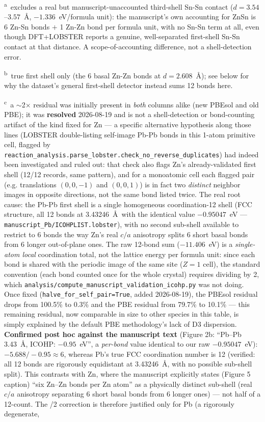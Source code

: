 \vspace{0.3em}
\noindent\textsuperscript{a}~excludes a real but manuscript-unaccounted third-shell Sn-Sn contact ($d=3.54$--$3.57$~\AA, $-1.336$~eV/formula unit): the manuscript's own accounting for ZnSn is 6 Zn-Sn bonds $+$ 1 Zn-Zn bond per formula unit, with no Sn-Sn term at all, even though DFT+LOBSTER reports a genuine, well-separated first-shell Sn-Sn contact at that distance. A scope-of-accounting difference, not a shell-detection error.

\noindent\textsuperscript{b}~true first shell only (the 6 basal Zn-Zn bonds at $d=2.608$~\AA); see below for why the dataset's general first-shell detector instead sums 12 bonds here.

\noindent\textsuperscript{c}~a $\sim$2$\times$ residual was initially present in \emph{both} columns alike (new PBEsol and old PBE); it was \textbf{resolved} 2026-08-19 and is not a shell-detection or bond-counting artifact of the kind fixed for Zn --- a specific alternative hypothesis along those lines (LOBSTER double-listing self-image Pb-Pb bonds in this 1-atom primitive cell, flagged by \texttt{reaction\_analysis.parse\_lobster.check\_no\_reverse\_duplicates}) had indeed been investigated and ruled out: that check also flags Zn's already-validated first shell (12/12 records, same pattern), and for a monoatomic cell each flagged pair (e.g. translations $(0,0,-1)$ and $(0,0,1)$) is in fact two \emph{distinct} neighbor images in opposite directions, not the same bond listed twice. The real root cause: the Pb-Pb first shell is a single homogeneous coordination-12 shell (FCC structure, all 12 bonds at 3.43246~\AA\ with the identical value $-0.95047$~eV --- \texttt{manuscript\_Pb/ICOHPLIST.lobster}), with no second sub-shell available to restrict to 6 bonds the way Zn's real $c/a$ anisotropy splits 6 short basal bonds from 6 longer out-of-plane ones. The raw 12-bond sum ($-11.406$~eV) is a \emph{single-atom local} coordination total, not the lattice energy per formula unit: since each bond is shared with the periodic image of the same site ($Z=1$ cell), the standard convention (each bond counted once for the whole crystal) requires dividing by 2, which \texttt{analysis/compute\_manuscript\_validation\_icohp.py} was not doing. Once fixed (\texttt{halve\_for\_self\_pair=True}, added 2026-08-19), the PBEsol residual drops from 100.5\% to 0.3\% and the PBE residual from 79.7\% to 10.1\% --- this remaining residual, now comparable in size to other species in this table, is simply explained by the default PBE methodology's lack of D3 dispersion. \textbf{Confirmed post hoc against the manuscript text} (Figure 2b: ``Pb--Pb 3.43~\AA, ICOHP: $-0.95$~eV'', a \emph{per-bond} value identical to our raw $-0.95047$~eV): $-5.688/-0.95\approx6$, whereas Pb's true FCC coordination number is 12 (verified: all 12 bonds are rigorously equidistant at 3.43246~\AA, with no possible sub-shell split). This contrasts with Zn, where the manuscript explicitly states (Figure 5 caption) ``six Zn--Zn bonds per Zn atom'' as a physically distinct sub-shell (real $c/a$ anisotropy separating 6 short basal bonds from 6 longer ones) --- not half of a 12-count. The /2 correction is therefore justified only for Pb (a rigorously degenerate, 